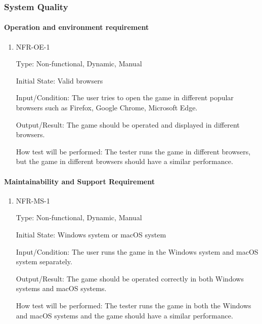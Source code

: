 \documentclass[12pt, titlepage]{article}
\begin{document}
\subsubsection{System Quality}
\paragraph{Operation and environment requirement}

\begin{enumerate}

\item{NFR-OE-1\\}

Type: Non-functional, Dynamic, Manual
					
Initial State: Valid browsers
					
Input/Condition: The user tries to open the game in different popular browsers such as Firefox, Google Chrome, Microsoft Edge.

Output/Result: The game should be operated and displayed in different browsers. 
	
How test will be performed: The tester runs the game in different browsers, but the game in different browsers should have a similar performance.  
\end{enumerate}

\paragraph{Maintainability and Support Requirement}

\begin{enumerate}

\item{NFR-MS-1\\}

Type: Non-functional, Dynamic, Manual
					
Initial State: Windows system or macOS system
					
Input/Condition: The user runs the game in the Windows system and macOS system separately. 
					
Output/Result: The game should be operated correctly in both Windows systems and macOS systems. 
					
How test will be performed: The tester runs the game in both the Windows and macOS systems and the game should have a similar performance. 
					

\end{enumerate}
\end{document}
